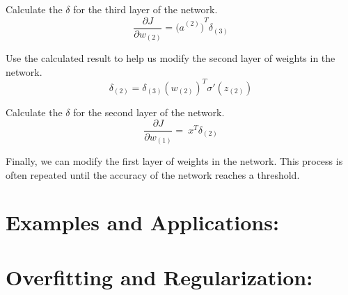 \documentclass[]{article}
\begin{document}
\begin{multicols}{2}
Calculate the \(\delta\) for the third layer of the network.
\[\frac{\partial J}{\partial w_{(2)}} = {{(a}^{(2)})}^{T}\delta_{(3)}\]

Use the calculated result to help us modify the second layer of weights
in the network.
\[\delta_{(2)} = \delta_{\left( 3 \right)}\left( w_{\left( 2 \right)} \right)^{T}\sigma'(z_{(2)})\]

Calculate the \(\delta\) for the second layer of the network.
\[\frac{\partial J}{\partial w_{(1)}} = \ x^{T}\delta_{(2)}\]

Finally, we can modify the first layer of weights in the network. This
process is often repeated until the accuracy of the network reaches a
threshold.

\section{Examples and Applications:}
\lipsum[4]
\section{Overfitting and Regularization:}
\lipsum[2]
\end{multicols}
\end{document}
